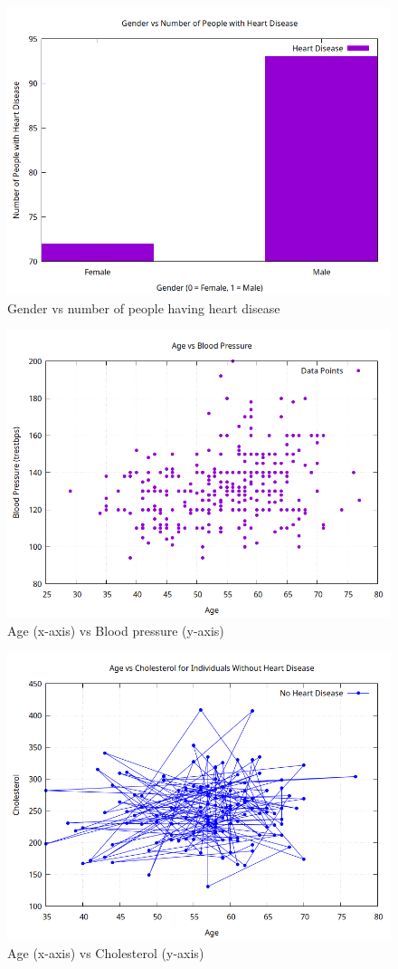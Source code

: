 \documentclass{article}
\begin{document}
	\begin{figure}
	\centering
	\includegraphics{q4a.png}
	\caption{\label{fig1} Gender vs number of people having heart disease}
    \end{figure}
    
    \begin{figure}
    	\centering
    	\includegraphics{q4b.png}
    	\caption{\label{fig2}Age (x-axis) vs Blood pressure (y-axis)}
    \end{figure}
    
    \begin{figure}
    	\centering
    	\includegraphics{q4c.png}
    	\caption{\label{fig3} Age (x-axis) vs Cholesterol (y-axis)}
    \end{figure}
    
\end{document}
